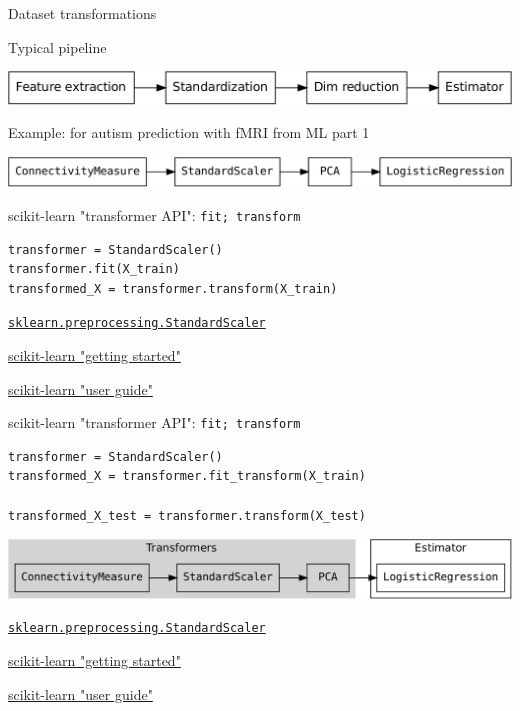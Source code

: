 \documentclass[presentation,mathserif,table]{beamer}
\begin{document}
\begin{frame}[label={sec:org0b49815}]{Dataset transformations}
\begin{block}{Typical pipeline}
\begin{center}
\includegraphics[width=.9\linewidth]{pipeline.pdf}
\end{center}
\end{block}

\begin{block}{Example: for autism prediction with fMRI from ML part 1}
\begin{center}
\includegraphics[width=.9\linewidth]{pipeline_example.pdf}
\end{center}
\end{block}
\end{frame}
\begin{frame}[label={sec:orgf64c49f},fragile]{scikit-learn "transformer API": \texttt{fit; transform}}
 \begin{verbatim}
transformer = StandardScaler()
transformer.fit(X_train)
transformed_X = transformer.transform(X_train)
\end{verbatim}
\vfill
\href{https://scikit-learn.org/stable/modules/generated/sklearn.preprocessing.StandardScaler.html\#sklearn.preprocessing.StandardScaler}{\texttt{sklearn.preprocessing.StandardScaler}}

\href{https://scikit-learn.org/stable/getting\_started.html\#transformers-and-pre-processors}{scikit-learn "getting started"}

\href{https://scikit-learn.org/stable/data\_transforms.html}{scikit-learn "user guide"}
\end{frame}
\begin{frame}[label={sec:orgddcb8f2},fragile]{scikit-learn "transformer API": \texttt{fit; transform}}
 \begin{verbatim}
transformer = StandardScaler()
transformed_X = transformer.fit_transform(X_train)

transformed_X_test = transformer.transform(X_test)
\end{verbatim}
\vfill
\begin{center}
\includegraphics[width=.9\linewidth]{pipeline_transformer_estimator.pdf}
\end{center}

\href{https://scikit-learn.org/stable/modules/generated/sklearn.preprocessing.StandardScaler.html\#sklearn.preprocessing.StandardScaler}{\texttt{sklearn.preprocessing.StandardScaler}}

\href{https://scikit-learn.org/stable/getting\_started.html\#transformers-and-pre-processors}{scikit-learn "getting started"}

\href{https://scikit-learn.org/stable/data\_transforms.html}{scikit-learn "user guide"}
\end{frame}
\end{document}
